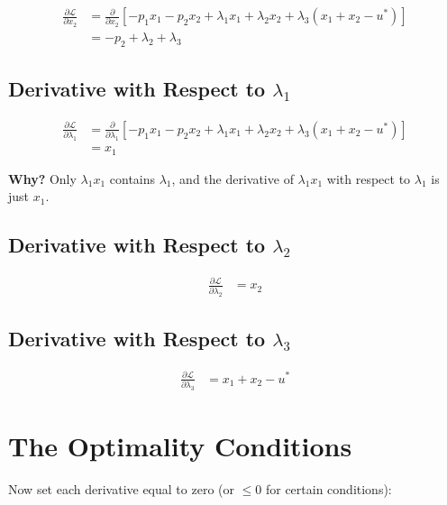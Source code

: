 \documentclass[11pt]{article}
\begin{document}
\begin{align*}
\frac{\partial \mathcal{L}}{\partial x_2} &= \frac{\partial}{\partial x_2}\left[-p_1 x_1 - p_2 x_2 + \lambda_1 x_1 + \lambda_2 x_2 + \lambda_3(x_1 + x_2 - u^*)\right] \\
&= -p_2 + \lambda_2 + \lambda_3
\end{align*}

\subsection{Derivative with Respect to $\lambda_1$}

\begin{align*}
\frac{\partial \mathcal{L}}{\partial \lambda_1} &= \frac{\partial}{\partial \lambda_1}\left[-p_1 x_1 - p_2 x_2 + \lambda_1 x_1 + \lambda_2 x_2 + \lambda_3(x_1 + x_2 - u^*)\right] \\
&= x_1
\end{align*}

\textbf{Why?} Only $\lambda_1 x_1$ contains $\lambda_1$, and the derivative of $\lambda_1 x_1$ with respect to $\lambda_1$ is just $x_1$.

\subsection{Derivative with Respect to $\lambda_2$}

\begin{align*}
\frac{\partial \mathcal{L}}{\partial \lambda_2} &= x_2
\end{align*}

\subsection{Derivative with Respect to $\lambda_3$}

\begin{align*}
\frac{\partial \mathcal{L}}{\partial \lambda_3} &= x_1 + x_2 - u^*
\end{align*}

\section{The Optimality Conditions}

Now set each derivative equal to zero (or $\leq 0$ for certain conditions):
\end{document}
